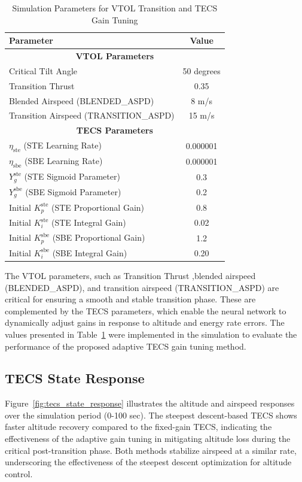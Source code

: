 \documentclass[journal,article,submit,pdftex,moreauthors]{Definitions/mdpi}
\begin{document}
\begin{table}[h]
    \centering
    \caption{Simulation Parameters for VTOL Transition and TECS Gain Tuning}
    \label{tab:simulation_parameters}
    \begin{tabular}{|l|c|}
        \hline
        \textbf{Parameter} & \textbf{Value} \\
        \hline
        \multicolumn{2}{|c|}{\textbf{VTOL Parameters}} \\
        \hline
        Critical Tilt Angle & 50 degrees \\
        Transition Thrust & 0.35 \\
        Blended Airspeed (BLENDED\_ASPD) & 8 m/s \\
        Transition Airspeed (TRANSITION\_ASPD) & 15 m/s \\
        \hline
        \multicolumn{2}{|c|}{\textbf{TECS Parameters}} \\
        \hline
        $\eta_{\text{ste}}$ (STE Learning Rate) & 0.000001 \\
        $\eta_{\text{sbe}}$ (SBE Learning Rate) & 0.000001 \\
        $Y_g^{\text{ste}}$ (STE Sigmoid Parameter) & 0.3 \\
        $Y_g^{\text{sbe}}$ (SBE Sigmoid Parameter) & 0.2 \\
        Initial $K_p^{\text{ste}}$ (STE Proportional Gain) & 0.8 \\
        Initial $K_i^{\text{ste}}$ (STE Integral Gain) & 0.02 \\
        Initial $K_p^{\text{sbe}}$ (SBE Proportional Gain) & 1.2 \\
        Initial $K_i^{\text{sbe}}$ (SBE Integral Gain) & 0.20 \\
        \hline
    \end{tabular}
\end{table}

The VTOL parameters, such as Transition Thrust ,blended airspeed (BLENDED\_ASPD), and transition airspeed (TRANSITION\_ASPD) are critical for ensuring a smooth and stable transition phase. These are complemented by the TECS parameters, which enable the neural network to dynamically adjust gains in response to altitude and energy rate errors. The values presented in Table~\ref{tab:simulation_parameters} were implemented in the simulation to evaluate the performance of the proposed adaptive TECS gain tuning method.

\subsection{TECS State Response}
Figure~\ref{fig:tecs_state_response} illustrates the altitude and airspeed responses over the simulation period (0-100 sec). The steepest descent-based TECS shows faster altitude recovery compared to the fixed-gain TECS, indicating the effectiveness of the adaptive gain tuning in mitigating altitude loss during the critical post-transition phase. Both methods stabilize airspeed at a similar rate, underscoring the effectiveness of the steepest descent optimization for altitude control.
\end{document}
